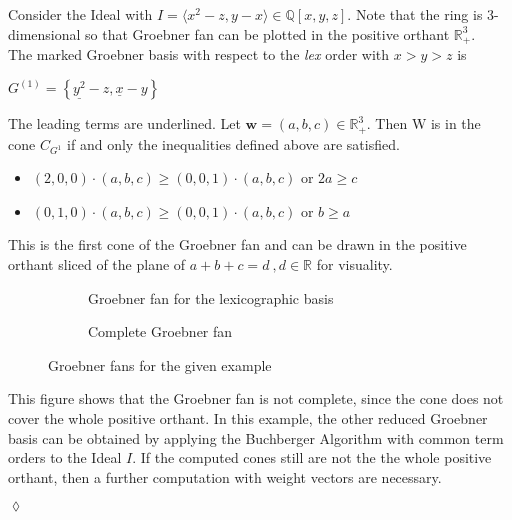 \begin{env_example}\normalfont
Consider the Ideal with $ I = \langle x^{2}-z,y-x \rangle \in \mathbb{Q}\left[ x,y,z\right] .$
Note that the ring is 3-dimensional so that Groebner fan can be plotted in the positive orthant $ \mathbb{R}^{3}_{+}$. \\
The marked Groebner basis with respect to the \textit{lex} order with $x>y>z$ is
\begin{center}
$G^{\left( 1\right) } = \left\lbrace \underline{y^{2}}-z,\underline{x} -y\right\rbrace $
\end{center}
The leading terms are underlined. Let $\textbf{w} = \left( a,b,c\right) \in \mathbb{R}^{3}_{+} $. Then W is in the cone $C_{G^{1}}$ if and only the inequalities defined above are satisfied.

\begin{itemize}

\item
$\left( 2,0,0\right) \cdot \left( a,b,c\right) \geq \left( 0,0,1\right) \cdot \left( a,b,c\right) $ or $2a\geq c$ 
\item
$\left( 0,1,0\right) \cdot \left( a,b,c\right) \geq \left( 0,0,1\right) \cdot \left( a,b,c\right) $ or $b\geq a$ 

\end{itemize} 

This is the first cone of the Groebner fan and can be drawn in the positive orthant sliced of the plane of $a+b+c=d~,d\in \mathbb{R}$ for visuality.


\begin{figure}
    \centering
    \begin{subfigure}[b]{0.48\linewidth}        %
        \centering
        
        \caption{Groebner fan for the lexicographic basis}
        \label{fig:singlegroebner}
    \end{subfigure}
    \begin{subfigure}[b]{0.48\linewidth}        %
        \centering
        
        \caption{Complete Groebner fan}
        \label{fig:completegroebner}
    \end{subfigure}
    \caption{Groebner fans for the given example}
    \label{fig:groebnerfans}
\end{figure}




This figure shows that the Groebner fan is not complete, since the cone does not cover the whole positive orthant. In this example, the other reduced Groebner basis can be obtained by applying the Buchberger Algorithm with common term orders to the Ideal $I$.
If the computed cones still are not the the whole positive orthant, then a further computation with weight vectors are necessary.

\begin{flushright}
$\lozenge$
\end{flushright} 
\end{env_example}




